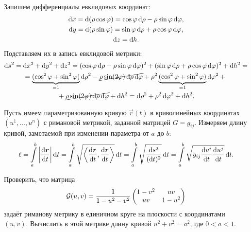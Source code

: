 \begin{solution}
	Запишем дифференциалы евклидовых координат:
	\begin{gather*}
		\d x = \d(\rho\cos\varphi) = \cos\varphi\d\rho - \rho\sin\varphi\d\varphi,\\
		\d y = \d(\rho\sin\varphi) = \sin\varphi\d\rho + \rho\cos\varphi\d\varphi,\\
		\d z = \d h.
	\end{gather*}
	Подставляем их в запись евклидовой метрики:
	\begin{multline*}
		\d s^2 = \d x^2 + \d y^2 + \d z^2 = (\cos\varphi\d\rho - \rho\sin\varphi\d\varphi)^2 + (\sin\varphi\d\rho + \rho\cos\varphi\d\varphi)^2 + \d h^2 =\\ = \underbrace{(\cos^2\varphi + \sin^2\varphi)}_{= 1}\d\rho^2 - \cancel{\rho\sin(2\varphi)\d\rho\d\varphi} + \rho^2\underbrace{(\cos^2\varphi + \sin^2\varphi)}_{= 1}\d\varphi^2 + {}\\{} + \cancel{\rho\sin(2\varphi)\d\rho\d\varphi} + \d h^2 = \d\rho^2 + \rho^2\d\varphi^2 + \d h^2.
	\end{multline*}
\end{solution}

Пусть имеем параметризованную кривую $\vec{r}(t)$ в криволинейных координатах $(u^1, \ldots, u^n)$ с римановой метрикой, заданной матрицей $G = g_{ij}$. Измеряем длину кривой, заметаемой при изменении параметра от $a$ до $b$:
\begin{equation} \label{eq:RiemannLength}
	\ell = \int\limits_a^b\abs{\frac{\d\vec{r}}{\d t}}\d t = \int\limits_a^b\sqrt{\left\langle \frac{\d\vec{r}}{\d t}, \frac{\d\vec{r}}{\d t} \right\rangle}\d t = \int\limits_a^b\sqrt{\frac{\d s^2}{(\d t)^2}}\d t = \int\limits_a^b\sqrt{g_{ij}\frac{\d u^i}{\d t}\frac{\d u^j}{\d t}}\d t.
\end{equation}

\begin{problem}
	Проверить, что матрица
	\[
		\mathcal{G}(u, v) = \frac{1}{1 - u^2 - v^2}
		\begin{pmatrix}
			1 - v^2 & uv\\
			uv & 1 - u^2
		\end{pmatrix}
	\]
	задаёт риманову метрику в единичном круге на плоскости с координатами $(u, v)$. Вычислить в этой метрике длину кривой $u^2 + v^2 = a^2$, где $0 < a < 1$.
\end{problem}

